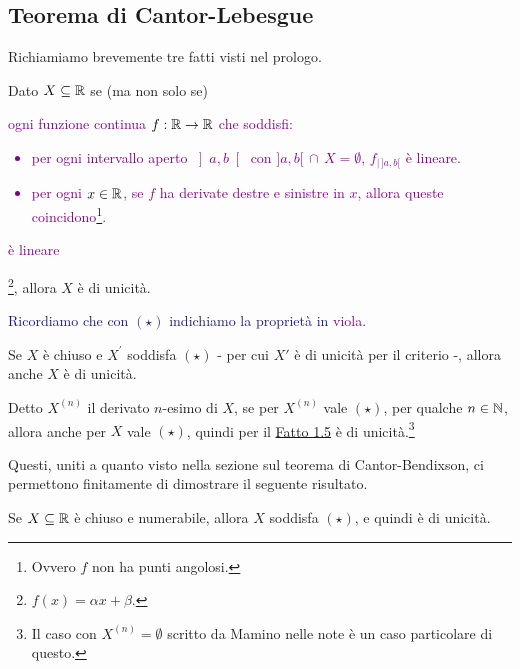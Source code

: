 \pagebreak
\subsection{Teorema di Cantor-Lebesgue}

Richiamiamo brevemente tre fatti visti nel prologo.

\begin{fact}
\label{unicità}
Dato $X \subseteq \mathbb R$ se (ma non solo se) \textcolor{purple}{ogni funzione continua $f : \mathbb R \to \mathbb R$ che soddisfi:
\begin{itemize}
	\item per ogni intervallo aperto $\left]a,b\right[$ con $]a,b[ \,\cap\, X = \emptyset$, $f_{| \, ]a,b[}$ è lineare.
	\item per ogni $x \in \mathbb R$, se $f$ ha derivate destre e sinistre in $x$, allora queste coincidono\footnote{Ovvero $f$ non ha punti angolosi.}.
\end{itemize}
è lineare}\footnote{$f(x) = \alpha x + \beta$.}, allora $X$ è di unicità.
\end{fact}

\textcolor{MidnightBlue}{Ricordiamo che con $(\star)$ indichiamo la proprietà in \textcolor{purple}{viola}.}

\begin{remark}
	Se $X$ è chiuso e $X^{\prime}$ soddisfa $(\star)$ - per cui $X'$ è di unicità per il criterio -, allora anche $X$ è di unicità.
\end{remark}

\begin{corollary}
Detto $X^{(n)}$ il derivato $n$-esimo di $X$, se per $X^{(n)}$ vale $(\star)$, per qualche $n \in \mathbb N$, allora anche per $X$ vale $(\star)$, quindi per il \hyperref[unicità]{Fatto 1.5} è di unicità.\footnote{Il caso con $X^{(n)} = \emptyset$ scritto da Mamino nelle note è un caso particolare di questo.}
\end{corollary}

Questi, uniti a quanto visto nella sezione sul teorema di Cantor-Bendixson, ci permettono finitamente di dimostrare il seguente risultato.

\begin{theorem}
	Se $X \subseteq \mathbb R$ è chiuso e numerabile, allora $X$ soddisfa $(\star)$, e quindi è di unicità.
\end{theorem}

